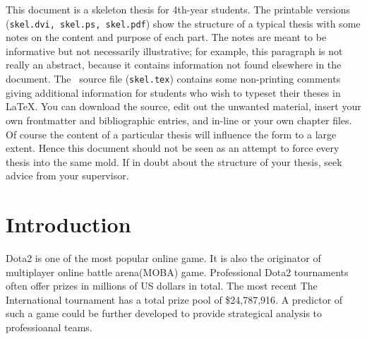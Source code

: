 \documentclass[12pt,openany,a4paper]{book}
\begin{document}
This document is a skeleton thesis for 4th-year students.  The
printable versions (\texttt{skel.dvi, skel.ps, skel.pdf})
show the structure of a typical thesis with some notes on the content
and purpose of each part.  The notes are meant to be informative but
not necessarily illustrative; for example, this paragraph is not
really an abstract, because it contains information not found
elsewhere in the document.  The \LaTeXe\ source file
(\texttt{skel.tex}) contains some non-printing comments giving
additional information for students who wish to typeset their theses
in \LaTeX.  You can download the source, edit out the unwanted
material, insert your own frontmatter and bibliographic entries, and
in-line or \verb++ your own chapter files.  Of course the
content of a particular thesis will influence the form to a large
extent.  Hence this document should not be seen as an attempt to force
every thesis into the same mold.  If in doubt about the structure of
your thesis, seek advice from your supervisor.

\tableofcontents

\listoffigures
{}

\listoftables
{}

% 

\cleardoublepage

\mainmatter


%
%
%
%	
%	

\chapter{Introduction}

Dota2 is one of the most popular online game. It is also the originator of multiplayer online battle arena(MOBA) game. Professional Dota2 tournaments often offer prizes in millions of US dollars in total. The most recent The International tournament has a total prize pool of \$24,787,916\cite{track}.  A predictor of such a game could be further developed to provide strategical analysis to professioanal teams.\\
\end{document}
